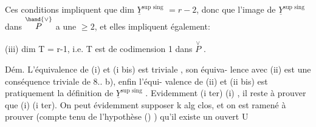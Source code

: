 Ces conditions impliquent que  dim $\underline{Y}^{\text{sup sing}}$ $= r-2$, donc que
l'image de $\underline{Y}^{\text{sup sing}}$ dans $\overset{\hand{\vee}}{P}$ a une  $\geqslant 2$, et  elles impliquent
également:

(iii) dim T = r-1, i.e. T est de codimension 1 dans $\overset{\vee}{P}$ .

Dém. L'équivalence de (i) et (i bis) est triviale , son équiva-%
lence avec (ii) est une conséquence triviale de 8.. b), enfin l'équi-%
valence de (ii) et (ii bis) est pratiquement la définition de
$\underline{Y}^{\text{sup sing}}$ . Evidemment (i ter) \hand{$\Longrightarrow$}(i) , il reste à prouver que (i)\hand{$\Longrightarrow$}
(i ter). On peut évidemment supposer k alg clos, et on est ramené à
prouver (compte tenu de l'hypothèse () ) qu'il existe un ouvert U\hand{$\neq\emptyset$}

